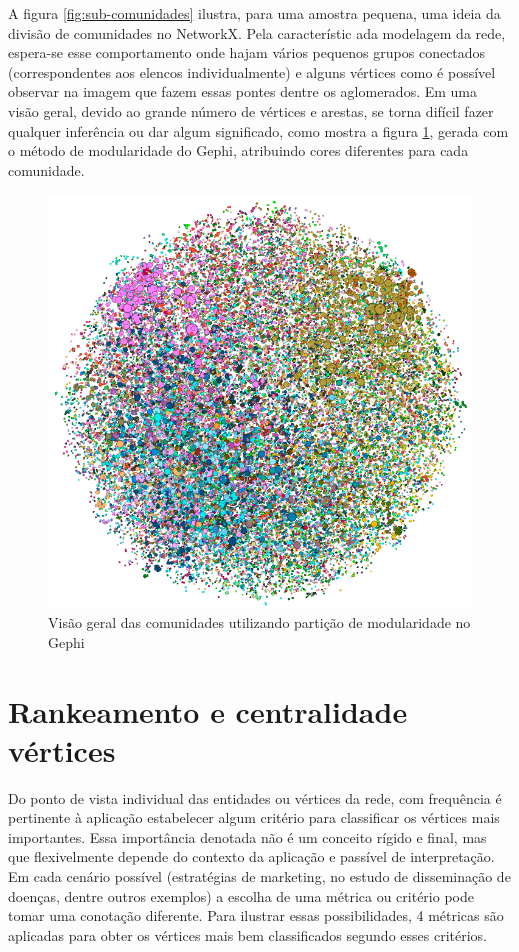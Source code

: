 A figura \ref{fig:sub-comunidades} ilustra, para uma amostra pequena, uma ideia da divisão de comunidades no NetworkX. Pela característic ada modelagem da rede, espera-se esse comportamento onde hajam vários pequenos grupos conectados (correspondentes aos elencos individualmente) e alguns vértices como é possível observar na imagem que fazem essas pontes dentre os aglomerados. Em uma visão geral, devido ao grande número de vértices e arestas, se torna difícil fazer qualquer inferência ou dar algum significado, como mostra a figura \ref{fig:grafo_overview}, gerada com o método de modularidade do Gephi, atribuindo cores diferentes para cada comunidade.

\begin{figure}[!htb]
\centering
\includegraphics[width=12cm]{img/grafo_overview.png}
\caption{Visão geral das comunidades utilizando partição de modularidade no Gephi}
\label{fig:grafo_overview}
\end{figure}


\section{Rankeamento e centralidade vértices}

Do ponto de vista individual das entidades ou vértices da rede, com frequência é pertinente à aplicação estabelecer algum critério para classificar os vértices mais importantes. Essa importância denotada não é um conceito rígido e final, mas que flexivelmente depende do contexto da aplicação e passível de interpretação. Em cada cenário possível (estratégias de marketing, no estudo de disseminação de doenças, dentre outros exemplos) a escolha de uma métrica ou critério pode tomar uma conotação diferente. Para ilustrar essas possibilidades, 4 métricas são aplicadas para obter os vértices mais bem classificados segundo esses critérios.

